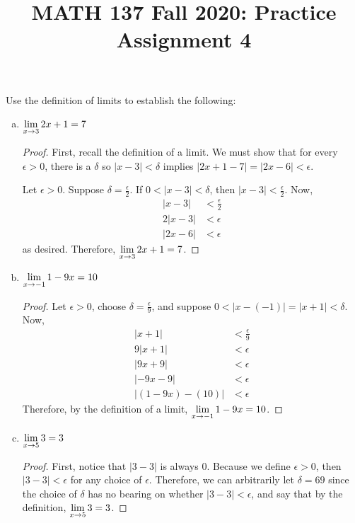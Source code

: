 \documentclass{agony}
\title{MATH 137 Fall 2020: Practice Assignment 4}
\begin{document}
\thispagestyle{firstpage}

\textbf{\thetitle}

\question Use the \epsdel{} definition of limits to establish the following:
\begin{enumerate}[(a)]
  \item $\lim\limits_{x\to3} 2x+1 = 7$
        \begin{proof}
          First, recall the \epsdel{} definition of a limit.
          We must show that for every $\epsilon > 0$, there is a $\delta$ so $|x-3|<\delta$ implies $|2x+1-7|=|2x-6|<\epsilon$.

          Let $\epsilon > 0$.
          Suppose $\delta = \frac{\epsilon}{2}$.
          If $0 < |x-3|<\delta$, then $|x-3|<\frac{\epsilon}{2}$. Now,
          \begin{align*}
            |x-3|  & < \frac{\epsilon}{2} \\
            2|x-3| & < \epsilon           \\
            |2x-6| & < \epsilon
          \end{align*}
          as desired. Therefore, $\lim\limits_{x\to3} 2x+1 = 7$.
        \end{proof}
  \item $\lim\limits_{x\to-1} 1-9x= 10$
        \begin{proof}
          Let $\epsilon > 0$, choose $\delta = \frac{\epsilon}{9}$, and suppose $0 < |x-(-1)| = |x+1| < \delta$. Now,
          \begin{align*}
            |x+1|           & < \frac{\epsilon}{9} \\
            9|x+1|          & < \epsilon           \\
            |9x+9|          & < \epsilon           \\
            |-9x-9|         & < \epsilon           \\
            |(1-9x) - (10)| & < \epsilon
          \end{align*}
          Therefore, by the \epsdel{} definition of a limit, $\lim\limits_{x\to-1} 1-9x = 10$.
        \end{proof}
  \item $\lim\limits_{x\to5} 3 = 3$
        \begin{proof}
          First, notice that $|3-3|$ is always 0.
          Because we define $\epsilon > 0$, then $|3-3| < \epsilon$ for any choice of $\epsilon$.
          Therefore, we can arbitrarily let $\delta = 69$ since the choice of $\delta$ has no bearing on whether $|3-3| < \epsilon$, and say that by the \epsdel{} definition, $\lim\limits_{x\to5} 3 = 3$.

\end{proof}
\end{enumerate}
\end{document}

